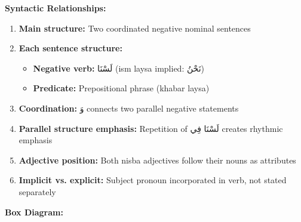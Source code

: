 \documentclass[letterpaper,12pt]{article}
\begin{document}
\begin{tcolorbox}[colback=white,colframe=accentcolor,breakable]
\vspace{1em}
\textbf{Syntactic Relationships:}
\begin{enumerate}
\item \textbf{Main structure:} Two coordinated negative nominal sentences
\item \textbf{Each sentence structure:}
  \begin{itemize}
    \item \textbf{Negative verb:} \textarabic{لَسْنَا} (ism laysa implied: \textarabic{نَحْنُ})
    \item \textbf{Predicate:} Prepositional phrase (khabar laysa)
  \end{itemize}
\item \textbf{Coordination:} \textarabic{وَ} connects two parallel negative statements
\item \textbf{Parallel structure emphasis:} Repetition of \textarabic{لَسْنَا فِي} creates rhythmic emphasis
\item \textbf{Adjective position:} Both nisba adjectives follow their nouns as attributes
\item \textbf{Implicit vs. explicit:} Subject pronoun incorporated in verb, not stated separately
\end{enumerate}

\vspace{1em}
\textbf{Box Diagram:}

\begin{center}
\end{center}
\end{tcolorbox}
\end{document}
